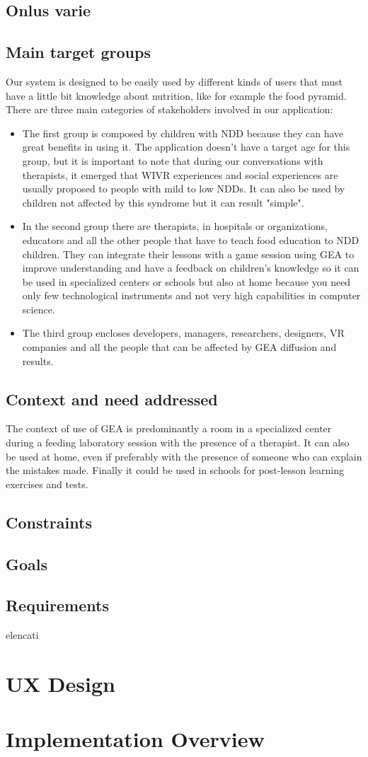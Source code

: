 \subsection{Onlus varie}
\subsection{Main target groups}
Our system is designed to be easily used by different kinds of users that must have a little bit knowledge about nutrition, like for example the food pyramid. There are three main categories of stakeholders involved in our application:
\begin{itemize}
\item The first group is composed by children with NDD because they can have great benefits in using it. The application doesn't have a target age for this group, but it is important to note that during our conversations with therapists, it emerged that WIVR experiences and social experiences are usually proposed to people with mild to low NDDs. It can also be used by children not affected by this syndrome but it can result "simple".
\item In the second group there are therapists, in hospitals or organizations, educators and all the other people that have to teach food education to NDD children. They can integrate their lessons with a game session using GEA to improve understanding and have a feedback on children's knowledge so it can be used in specialized centers or schools but also at home because you need only few technological instruments and not very high capabilities in computer science.
\item The third group encloses developers, managers, researchers, designers, VR companies and all the people that can be affected by GEA diffusion and results.
\end{itemize} 
\subsection{Context and need addressed}
The context of use of GEA is predominantly a room in a specialized center during
a feeding laboratory session with the presence of a therapist. It can also be used at home, even if preferably with the presence of someone who can explain the mistakes made. Finally it could be used in schools for post-lesson learning exercises and tests.
\subsection{Constraints}
\subsection{Goals}
\subsection{Requirements}
elencati

\section{UX Design}
\section{Implementation Overview}